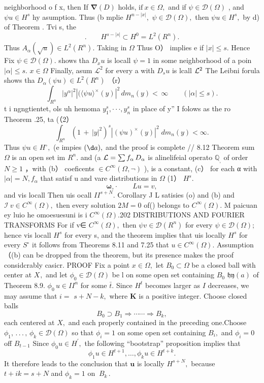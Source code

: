 neighborhood o f x, then If $\mathbf{\nabla}(D)$ holds, ${\mathrm{if~}}x\in\Omega,$ and if $\textstyle\psi\in{\mathcal{D}}(\Omega)$ , and $\psi u\in H^{s}$ hy asumption. Thus (b mplie $H^{n-|x|},$ $\psi\in{\mathcal{D}}(\Omega),$ then $\textstyle\psi u\in H^{s},$ by d) of Theorem . Tvi s, the $$ .\qquad H^{s-\left|s\right|}\subset H^{0}=L^{2}(R^{n}). $$ Thus $A_{\alpha}(\sqrt{u})\in L^{2}(R^{n}).$ Taking in $\Omega$ Thus O） implies e if $|x|\leq s.$ Hence Fix $\psi\in{\mathcal{D}}(\Omega).$ shows tha $D_{x}u$ is locall $\psi=1$ in some neighborhood of a poin $\left|\alpha\right|\leq s.$ $x\in\Omega$ Finally, asum ${\mathcal{L}}^{2}$ for every a with $\scriptstyle D_{s}u$ is lcall ${\cal L}^{2}$ The Leibni forula shows tha $D_{\alpha}(\psi u)\in L^{2}(R^{n})$ （r） $$ \int_{R^{n}}|y^{\alpha}|^{2}|(\langle\psi u\rangle^{\times}(y)|^{2}\,d m_{n}(y)<\,\infty\qquad(|\alpha|\leq s). $$ t i ngngtientet, ols uh hemoma $y_{1}^{s},\cdot\cdot\cdot,y_{n}^{s}$ in place of y” I folows as the ro Theorem .25, ta (（2） $$ \int_{R^{n}}(1\,+\,|y|^{2})^{s}|(\psi u)^{\times}(y)|^{2}\;d m_{n}(y)<\infty. $$ Thus $\psi u\in H^{\circ},$ (e impies $(\d a),$ and the proof is complete // 8.12 Theorem sum $\Omega$ is an open set im $R^{n}.$ and (a ${\cal L}=\sum f_{\alpha}\,D_{\alpha}$ is alinelifeial operato $\mathbb{Q}_{,}$ of order $N\geq1$ ，with (b） coeficents $\in{C^{\infty}(\Omega,\lnot)}$ ), is a constant, (c） for each α with $|\alpha|=N,f_{\alpha}$ that satisf u and vare distributions in $\Omega$ (1） $H^{s}.$ $$ \mathbf{\omega}_{\circ}\cdot\qquad L u=v, $$ and vis locall Then uis ocall $I I^{s+N}.$ Corollary J L satisies (o) and (b) and ${\mathcal{I}}\ v\in C^{\infty}(\Omega),$ then every solution $\mathrm{2}M=0$ of() belongs to $C^{\infty}(\Omega).$ M paicuan ey luio he omoesuesuni is i $C^{\infty}(\Omega).$202 DISTRIBUTIONS AND FOURIER TRANSFORMS For if v∈ $C^{\infty}(\Omega),$ then $\psi v\in{\mathcal{D}}(R^{n})$ for every $\psi\in{\mathcal{D}}(\Omega);$ hence vis locall $H^{s}$ for every s, and the theorem implies that uis locally $H^{s}$ for every $S^{\circ}$ it follows from Theorems 8.11 and 7.25 that $u\in C^{\infty}(\Omega).$ Assumption（(b) can be dropped from the theorem, but its presence makes the proof considcrably casicr. PROOF Fix a point $x\in\Omega,$ let $B_{0}\subset\Omega$ be a closed ball with center at $X_{},$ and let $\phi_{0}\in{\mathcal{D}}(\Omega)$ be l on some open set containing $B_{0}$ $\mathfrak{h y}\left(a\right)$ of Theorem 8.9. $\phi_{0}\,u\in I I^{n}$ for some ${\bar{t}}.$ Since $H^{t}$ becomes larger as ${\mathbf{}}I$ decreases, we may assume that ${\mathit{i}}=$ $s+N-k,$ where $\boldsymbol{K}$ is a positive integer. Choose closed balls $$ B_{0}\supset B_{1}\Rightarrow\cdots\cdots\Rightarrow B_{k}, $$ each centered at $X,$ and each properly contained in the preceding one.Choose $\phi_{1},\,.\,.\,.\,,\,\phi_{k}\in\mathcal{D}(\Omega)$ so that $\phi_{i}=1$ on some open set containing $B_{i},$ and $\phi_{i}=0$ off $\scriptstyle B_{t-1}$ Since $\phi_{0}u\in H^{\prime},$ the following “bootstrap” proposition implies that $$ \phi_{1}u\in H^{t+1},\ldots,\phi_{k}u\in H^{t+k}. $$ It therefore leads to the conclusion that $\boldsymbol{u}$ is locally $H^{s+N},$ because $t+i k=s+N$ and $\phi_{k}=1$ on $\ B_{k}\,.$ 
